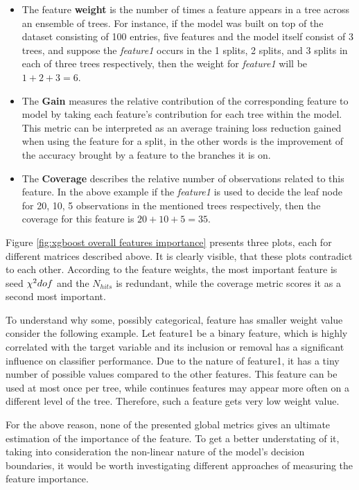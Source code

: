 \begin{itemize}
    \item The feature \textbf{weight} is the number of times a feature appears in a tree across an ensemble of trees. For instance, if the model was built on top of the dataset consisting  of 100 entries, five features and the model itself consist of 3 trees, and suppose the \textit{feature1} occurs in the 1 splits, 2 splits, and 3 splits in each of three trees respectively, then the weight for \textit{feature1} will be $1+2+3=6$.   
    \item The \textbf{Gain} measures the relative contribution of the corresponding feature to model by taking each feature's contribution for each tree within the model. This metric can be interpreted as an average training loss reduction gained when using the feature for a split, in the other words is the improvement of the accuracy brought by a feature to the branches it is on. 
    \item The \textbf{Coverage} describes the relative number of observations related to this feature. In the above example if the \textit{feature1} is used to decide the leaf node for 20, 10, 5 observations in the mentioned trees respectively, then the coverage for this feature is $20+10+5 = 35$.   
\end{itemize}

Figure \ref{fig:xgboost overall features importance} presents three plots, each for different matrices described above. It is clearly visible, that these plots contradict to each other. According to the feature weights, the most important feature is seed $\chi^2\/dof$ and the $N_{hits}$ is redundant, while the coverage metric scores it as a second most important.

To understand why some, possibly categorical, feature has smaller weight value consider the following example. Let feature1 be a binary feature, which is highly correlated with the target variable and its inclusion or removal has a significant influence on classifier performance. Due to the nature of feature1, it has a tiny number of possible values compared to the other features. This feature can be used at most once per tree, while continues features may appear more often on a different level of the tree. Therefore, such a feature gets very low weight value. 

For the above reason, none of the presented global metrics gives an ultimate estimation of the importance of the feature. To get a better understating of it, taking into consideration the non-linear nature of the model's decision boundaries, it would be worth investigating different approaches of measuring the feature importance.  

